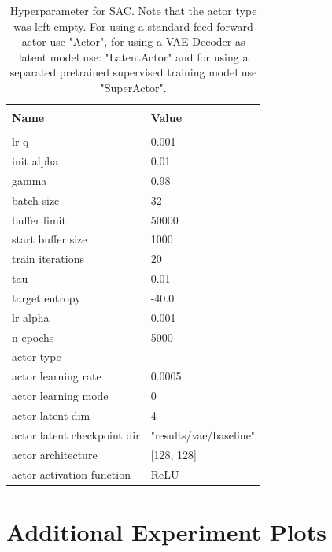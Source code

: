 \begin{table}[h]
    \label{tab:SAC_Baseline_Hyperparameters}
    \begin{center}
        \begin{tabular}{ l | l }
        \hline \\
        \textbf{Name} & \textbf{Value} \\
        \hline \\
        lr q & 0.001 \\
        init alpha & 0.01 \\
        gamma & 0.98\\
        batch size & 32 \\
        buffer limit & 50000 \\
        start buffer size & 1000 \\
        train iterations & 20 \\
        tau & 0.01 \\
        target entropy & -40.0 \\
        lr alpha & 0.001 \\
        n epochs & 5000 \\
        actor type & - \\
        actor learning rate & 0.0005 \\
        actor learning mode & 0 \\
        actor latent dim & 4 \\
        actor latent checkpoint dir & "results/vae/baseline" \\
        actor architecture & [128, 128] \\
        actor activation function & ReLU \\
        \end{tabular}
    \end{center}
    \caption[SAC Hyperparameter]{Hyperparameter for SAC. Note that the actor type was left empty. For using a standard feed forward actor use "Actor", for using a VAE Decoder as  latent model use: "LatentActor" and for using a separated pretrained supervised training model use "SuperActor".}
\end{table}

\section{Additional Experiment Plots}

